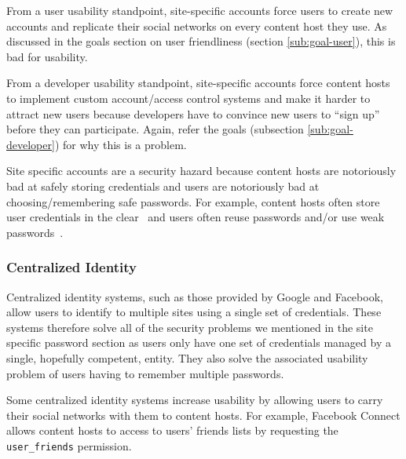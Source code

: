 \documentclass[pdftex,12pt,a4papaer,twoside,notitlepage]{report}
\begin{document}
From a user usability standpoint, site-specific accounts force users to create
new accounts and replicate their social networks on every content host they use.
As discussed in the goals section on user friendliness (section
\ref{sub:goal-user}), this is bad for usability.


From a developer usability standpoint, site-specific accounts force content
hosts to implement custom account/access control systems and make it harder to
attract new users because developers have to convince new users to ``sign up''
before they can participate. Again, refer the goals (subsection \ref{sub:goal-developer}) for
why this is a problem.


Site specific accounts are a security hazard because content hosts are
notoriously bad at safely storing credentials and users are notoriously bad at
choosing/remembering safe passwords. For example, content hosts often store user
credentials in the clear~\cite{plaintext} and users often reuse passwords and/or
use weak passwords~\cite{ms-passwords}.


\subsubsection{Centralized Identity}

Centralized identity systems, such as those provided by Google and Facebook,
allow users to identify to multiple sites using a single set of credentials.
These systems therefore solve all of the security problems we mentioned in the
site specific password section as users only have one set of credentials managed
by a single, hopefully competent, entity. They also solve the associated
usability problem of users having to remember multiple passwords.

Some centralized identity systems increase usability by allowing users to carry
their social networks with them to content hosts. For example, Facebook Connect
allows content hosts to access to users' friends lists by requesting the
\verb=user_friends= permission\cite{facebook-connect-user-friends}.
\end{document}
